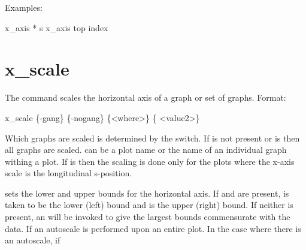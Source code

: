 {{{{{{{{{{Examples:
\begin{example}
  x_axis * s
  x_axis top index
\end{example}

\section{x_scale}
\label{s:x.scale}

The  command scales the horizontal axis of a graph or set of graphs. Format:
\begin{example}
  x_scale \{-gang\} \{-nogang\} \{<where>\} \{<value1> <value2>\}
\end{example}

Which graphs are scaled is determined by the  switch. If  is not present or
 is \vn{*} then all graphs are scaled.  can be a plot name or the name of an
individual graph withing a plot.  If  is  then the scaling is done only for the
plots where the x-axis scale is the longitudinal s-position.

\vskip 7pt 

 sets the lower and upper bounds for the horizontal axis.  If  and
 are present,  is taken to be the lower (left) bound and  is
the upper (right) bound. If neither is present, an  will be invoked to give the
largest bounds commensurate with the data. If an autoscale is performed upon an entire plot. In the
case where there is an autoscale, if \vn{plot%
the chosen scales will be the same for all graphs. That is, a single scale is calculated so that all
the data of all the graphs is within the plot region. The affect of \vn{plot%
be overridden by using the \vn{-gang} or \vn{-nogang} switches.

Note: The \vn{x_scale} command will vary the number of major divisions (set by
plot%
that if two plots have the same range of data but differing major division settings, the
\vn{x_scale} command can produce differing results.

Example:
\begin{example}
  x_scale                 ! Autoscale all x-axes.
  x_scale * 0 100         ! Scale all x-axes to go from 0 to 100.
  x_scale orbit -10 10    ! This "wraps around" the beginning of the lattice.
\end{example}

}}}}}}}}}}}}
